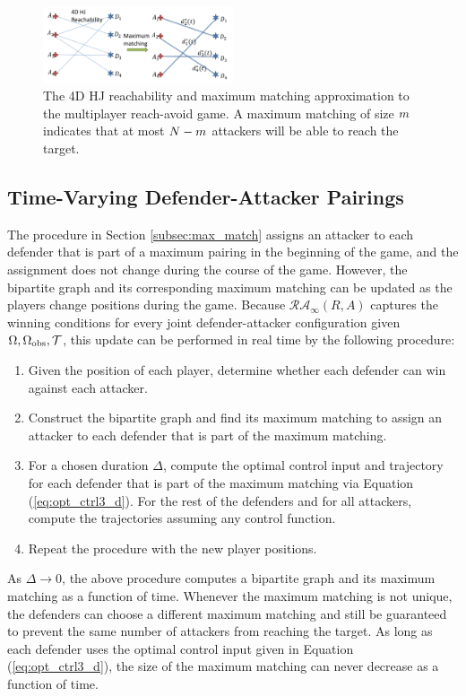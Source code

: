 \begin{figure}[h]
\centering
\includegraphics[width=0.5\textwidth]{"fig/general procedure"}
\caption{The 4D HJ reachability and maximum matching approximation to the multiplayer reach-avoid game. A maximum matching of size $m$ indicates that at most $N-m$ attackers will be able to reach the target.}
\label{fig:general_procedure}
\end{figure}

\subsection{Time-Varying Defender-Attacker Pairings}
\label{subsec:tvarp}
The procedure in Section \ref{subsec:max_match} assigns an attacker to each defender that is part of a maximum pairing in the beginning of the game, and the assignment does not change during the course of the game. However, the bipartite graph and its corresponding maximum matching can be updated as the players change positions during the game. Because $\mathcal{RA}_\infty(R,A)$ captures the winning conditions for every joint defender-attacker configuration given $\Omega,\Omega_{\text{obs}},\mathcal{T}$, this update can be performed in real time by the following procedure:

\begin{enumerate}
\item Given the position of each player, determine whether each defender can win against each attacker. 
\item Construct the bipartite graph and find its maximum matching to assign an attacker to each defender that is part of the maximum matching.
\item For a chosen duration $\Delta$, compute the optimal control input and trajectory for each defender that is part of the maximum matching via Equation (\ref{eq:opt_ctrl3_d}). For the rest of the defenders and for all attackers, compute the trajectories assuming any control function.
\item Repeat the procedure with the new player positions.
\end{enumerate}

As $\Delta\rightarrow 0$, the above procedure computes a bipartite graph and its maximum matching as a function of time. Whenever the maximum matching is not unique, the defenders can choose a different maximum matching and still be guaranteed to prevent the same number of attackers from reaching the target. As long as each defender uses the optimal control input given in Equation (\ref{eq:opt_ctrl3_d}), the size of the maximum matching can never decrease as a function of time. 

